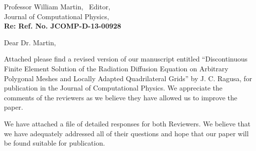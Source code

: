 \begin{letter}{Professor William Martin, \  Editor,\\
    Journal of Computational Physics,\\
\textbf{Re: Ref. No. JCOMP-D-13-00928}}





\date{\today}

\opening{Dear Dr. Martin,}
         \vspace{0.25cm}

Attached please find a revised version of our manuscript entitled
``Discontinuous Finite Element Solution of the Radiation Diffusion Equation on Arbitrary Polygonal Meshes and Locally Adapted Quadrilateral Grids'' 
by J. C. Ragusa, for
publication in the Journal of Computational Physics. We appreciate the comments of the reviewers as we
believe they have allowed us to improve the paper.

We have attached a file of detailed responses for both Reviewers.
We believe that we have adequately addressed all of their questions and hope that our paper will be found suitable for publication.


\end{letter}
